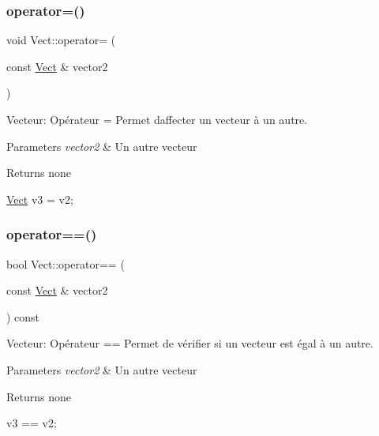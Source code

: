 \subsubsection{\texorpdfstring{operator=()}{operator=()}}
{\footnotesize\ttfamily void Vect\+::operator= (\begin{DoxyParamCaption}\item[{const \hyperlink{classVect}{Vect} \&}]{vector2 }\end{DoxyParamCaption})}



Vecteur\+: Opérateur = Permet d\textquotesingle{}affecter un vecteur à un autre\textquotesingle{}. 


\begin{DoxyParams}{Parameters}
{\em vector2} & Un autre vecteur \\
\hline
\end{DoxyParams}
\begin{DoxyReturn}{Returns}
none 
\begin{DoxyCode}
\hyperlink{classVect}{Vect} v3 = v2;
\end{DoxyCode}
 
\end{DoxyReturn}
\mbox{\label{classVect_a4a436a5c1301158cebed48d624aa4a9c}} 
\subsubsection{\texorpdfstring{operator==()}{operator==()}}
{\footnotesize\ttfamily bool Vect\+::operator== (\begin{DoxyParamCaption}\item[{const \hyperlink{classVect}{Vect} \&}]{vector2 }\end{DoxyParamCaption}) const}



Vecteur\+: Opérateur == Permet de vérifier si un vecteur est égal à un autre. 


\begin{DoxyParams}{Parameters}
{\em vector2} & Un autre vecteur \\
\hline
\end{DoxyParams}
\begin{DoxyReturn}{Returns}
none 
\begin{DoxyCode}
v3 == v2;
\end{DoxyCode}
 
\end{DoxyReturn}
\mbox{\label{classVect_a28408435bc900905d3416aef70140cd9}} 
